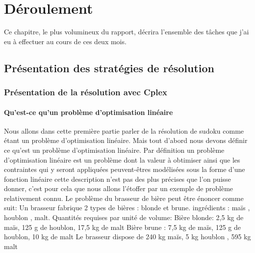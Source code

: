 \hypertarget{Déroulement}{%
\chapter{Déroulement}\label{Déroulement}}

Ce chapitre, le plus volumineux du rapport, décrira l'ensemble des tâches que j'ai eu à effectuer au cours de ces deux mois.


\section{Présentation des stratégies de résolution}
\subsection{Présentation de la résolution avec Cplex}
\subsubsection{Qu'est-ce qu'un problème d'optimisation linéaire}
Nous allons dans cette première partie parler de la résolution de sudoku comme étant un problème d'optimisation linéaire. Mais tout d'abord nous devons définir ce qu'est un problème d'optimisation linéaire.\newline\newline
Par définition un problème d'optimisation linéaire est un problème dont la valeur à obtimiser ainsi que les contraintes qui y seront appliquées peuvent-êtres modélisées sous la forme d'une fonction linéaire cette description n'est pas des plus précises que l'on puisse donner, c'est pour cela que nous allons l'étoffer par un exemple de problème relativement connu.\newline\newline
Le problème du brasseur de bière peut être énoncer comme suit:\newline\newline
Un brasseur fabrique 2 types de bières : blonde et brune. ingrédients : maïs , houblon , malt.\newline
Quantités requises par unité de volume:\newline
Bière blonde: 2,5 kg de maïs, 125 g de houblon, 17,5 kg de malt\newline
Bière brune : 7,5 kg de maïs, 125 g de houblon, 10 kg de malt\newline
Le brasseur dispose de 240 kg maïs, 5 kg houblon , 595 kg malt\newline
